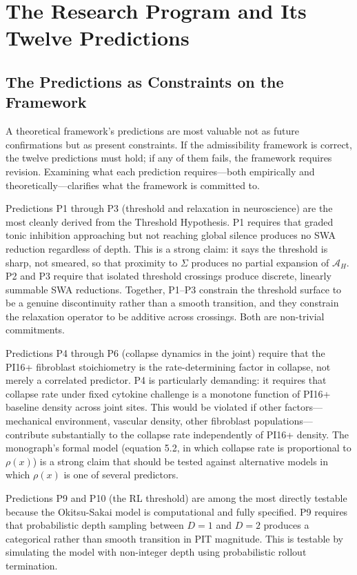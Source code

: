 \documentclass[12pt, a4paper]{article}
\theoremstyle{definition}
\begin{document}
\section{The Research Program and Its Twelve Predictions}

\subsection{The Predictions as Constraints on the Framework}

A theoretical framework's predictions are most valuable not as future confirmations but as present constraints. If the admissibility framework is correct, the twelve predictions must hold; if any of them fails, the framework requires revision. Examining what each prediction requires---both empirically and theoretically---clarifies what the framework is committed to.

Predictions P1 through P3 (threshold and relaxation in neuroscience) are the most cleanly derived from the Threshold Hypothesis. P1 requires that graded tonic inhibition approaching but not reaching global silence produces no SWA reduction regardless of depth. This is a strong claim: it says the threshold is sharp, not smeared, so that proximity to $\Sigma$ produces no partial expansion of $\mathcal{A}_H$. P2 and P3 require that isolated threshold crossings produce discrete, linearly summable SWA reductions. Together, P1--P3 constrain the threshold surface to be a genuine discontinuity rather than a smooth transition, and they constrain the relaxation operator to be additive across crossings. Both are non-trivial commitments.

Predictions P4 through P6 (collapse dynamics in the joint) require that the PI16+ fibroblast stoichiometry is the rate-determining factor in collapse, not merely a correlated predictor. P4 is particularly demanding: it requires that collapse rate under fixed cytokine challenge is a monotone function of PI16+ baseline density across joint sites. This would be violated if other factors---mechanical environment, vascular density, other fibroblast populations---contribute substantially to the collapse rate independently of PI16+ density. The monograph's formal model (equation 5.2, in which collapse rate is proportional to $\rho(x)$) is a strong claim that should be tested against alternative models in which $\rho(x)$ is one of several predictors.

Predictions P9 and P10 (the RL threshold) are among the most directly testable because the Okitsu-Sakai model is computational and fully specified. P9 requires that probabilistic depth sampling between $D = 1$ and $D = 2$ produces a categorical rather than smooth transition in PIT magnitude. This is testable by simulating the model with non-integer depth using probabilistic rollout termination.
\end{document}
